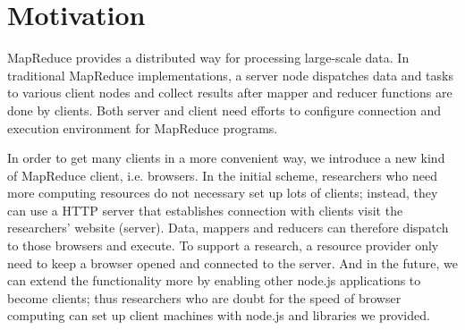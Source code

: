 \section{Motivation}

MapReduce\cite{mapreduce} provides a distributed way for processing large-scale data. In traditional MapReduce implementations, a server node dispatches data and tasks to various client nodes and collect results after mapper and reducer functions are done by clients. Both server and client need efforts to configure connection and execution environment for MapReduce programs.

In order to get many clients in a more convenient way, we introduce a new kind of MapReduce client, i.e. browsers. In the initial scheme, researchers who need more computing resources do not necessary set up lots of clients; instead, they can use a HTTP server that establishes connection with clients visit the researchers’ website (server).
Data, mappers and reducers can therefore dispatch to those browsers and execute. To support a research, a resource provider only need to keep a browser opened and connected to the server.
And in the future, we can extend the functionality more by enabling other node.js\cite{nodejs} applications to become clients; thus researchers who are doubt for the speed of browser computing can set up client machines with node.js and libraries we provided.